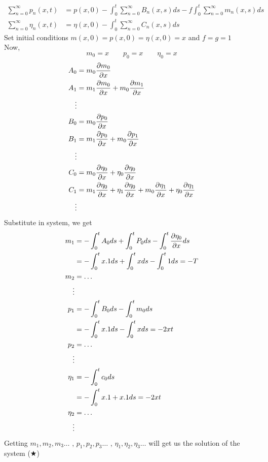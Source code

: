 \begin{example}
\begin{align*}
        \\
        \sum_{n=0}^{\infty} p_n(x,t)    & = p(x,0) - \int_{0}^{t} \sum_{n=0}^{\infty} B_n(x,s)  ds - f\int_{0}^{t} \sum_{n=0}^{\infty} m_n(x,s) ds
        \\
        \sum_{n=0}^{\infty} \eta_n(x,t) & = \eta(x,0) - \int_{0}^{t} \sum_{n=0}^{\infty} C_n(x,s)ds
    \end{align*}
    \newpage
    Set initial conditions $m(x,0)=p(x,0)=\eta(x,0) = x$ and $f = g = 1$\\
    Now,
    \begin{equation*}
        m_0 = x \qquad p_0 = x \qquad \eta_0 = x
    \end{equation*}
    \begin{align*}
        A_0 & = m_0 \pdv{m_0}{x}
        \\
        A_1 & = m_1 \pdv{m_0}{x} + m_0 \pdv{m_1}{x}
        \\
        \vdots
        \\
        B_0 & = m_0 \pdv{p_0}{x}
        \\
        B_1 & = m_1 \pdv{p_0}{x} + m_0 \pdv{p_1}{x}
        \\
        \vdots
        \\
        C_0 & = m_0 \pdv{\eta_0}{x} + \eta_0 \pdv{\eta_0}{x}
        \\
        C_1 & = m_1 \pdv{\eta_0}{x} + \eta_1 \pdv{\eta_0}{x}+ m_0 \pdv{\eta_1}{x} + \eta_0 \pdv{\eta_1}{x}
        \\
        \vdots
    \end{align*}
    Substitute in system, we get
    \begin{align*}
        m_1    & = - \int_0^t A_0 ds + \int_0^t P_0 ds - \int_0^t \pdv{\eta_0}{x} ds
        \\
               & = - \int_0^t x.1 ds + \int_0^t x ds - \int_0^t 1 ds = -T
        \\
        m_2    & = \dots
        \\
        \vdots
        \\
        p_1    & = -\int_0^t B_0 ds - \int_0^t m_0 ds
        \\
               & = -\int_0^t x.1 ds - \int_0^t x ds = -2xt
        \\
        p_2    & = \dots
        \\
        \vdots
        \\
        \eta_1 & = -\int_0^t c_0 ds
        \\
               & = - \int_0^t x.1 + x.1 ds = -2xt
        \\
        \eta_2 & = \dots
        \\
        \vdots
    \end{align*}
    Getting $m_1,m_2,m_3\dots$ , $p_1,p_2,p_3\dots$ , $\eta_1,\eta_2,\eta_3\dots$ will get us the solution of the system ($\bigstar$)
\end{example}
\setcounter{equation}{0}
\newpage
